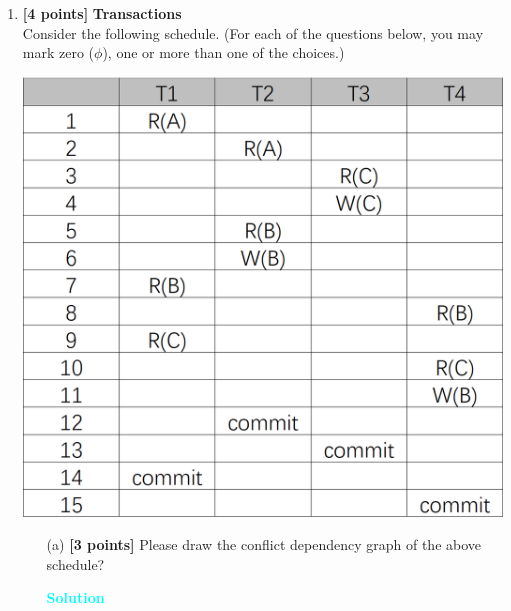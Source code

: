 \documentclass[10pt]{article}
\newenvironment{solution}
    { \begin{mdframed}[backgroundcolor=gray!10] \textcolor{cyan}{\textbf{Solution}} \\}
    {  \end{mdframed}}
\begin{document}
\begin{enumerate}

	\item \textbf{[4 points]} \textbf{Transactions} \\
	      Consider the following schedule. (For each of the questions below, you may mark zero ($\phi$), one
	      or more than one of the choices.)
	      \begin{center}
		      \includegraphics[scale=0.35]{transaction}
	      \end{center}
	      \begin{itemize}
		      \item[(a)] \textbf{[3 points]} Please draw the conflict dependency graph of the above schedule?\\
		            \begin{solution}
			            \begin{center}

\end{center}
\end{solution}
\end{itemize}
\end{enumerate}
\end{document}
